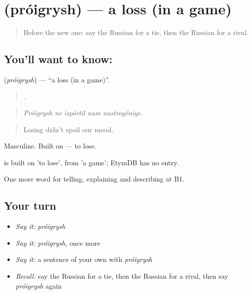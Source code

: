 \section[\texorpdfstring{\ru{проигрыш} (próigrysh)}{проигрыш (próigrysh)}]{ (próigrysh) — a loss (in a game)}

\label{lesson:RU-C510-proigrysh}



\begin{quote}
Before the new one: say the Russian for a tie, then the Russian for a rival.
\end{quote}

\subsection*{You'll want to know: }
\textbf{} (\emph{próigrysh}) — \textquotedblleft{}a loss (in a game)\textquotedblright{}.

\begin{quote}
    .
\end{quote}

\begin{quote}
\emph{Próigrysh ne ispórtil nam nastroyéniye.}
\end{quote}

\begin{quote}
Losing didn't spoil our mood.
\end{quote}

Masculine. Built on \emph{} — to lose.

\begin{cousinweb}
\emph{} is built on \emph{} 'to lose', from \emph{} 'a game'; EtymDB has no entry.
\end{cousinweb}

\begin{grammarlens}[title={What you've built}]
One more word for telling, explaining and describing at B1.
\end{grammarlens}

\subsection*{Your turn}
\begin{itemize}
\raggedright
  \item \emph{Say it:} \emph{próigrysh}
  \item \emph{Say it:} \emph{próigrysh}, once more
  \item \emph{Say it:} a sentence of your own with \emph{próigrysh}
  \item \emph{Recall:} say the Russian for a tie, then the Russian for a rival, then say \emph{próigrysh} again
\end{itemize}

